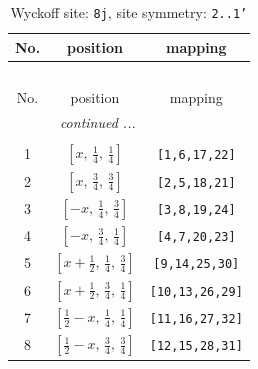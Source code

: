 \documentclass[fleqn,8pt]{jsarticle}
\begin{document}
\begin{longtable}{ccc}
\caption{Wyckoff site: {\tt 8j}, site symmetry: {\tt 2..1'}}
 \\
 \hline \hline
No. & position & mapping \\ \hline \endfirsthead

\multicolumn{2}{l}{\tablename\ \thetable{}} \\
 \hline \hline
No. & position & mapping \\ \hline \endhead

 \hline \hline
\multicolumn{2}{r}{\footnotesize\it continued ...} \\ \endfoot

 \hline \hline
\multicolumn{2}{r}{} \\ \endlastfoot

1 & $\left[ x,\, \frac{1}{4},\, \frac{1}{4} \right]$ & {\tt [1,6,17,22]} \\ \hline
2 & $\left[ x,\, \frac{3}{4},\, \frac{3}{4} \right]$ & {\tt [2,5,18,21]} \\ \hline
3 & $\left[ - x,\, \frac{1}{4},\, \frac{3}{4} \right]$ & {\tt [3,8,19,24]} \\ \hline
4 & $\left[ - x,\, \frac{3}{4},\, \frac{1}{4} \right]$ & {\tt [4,7,20,23]} \\ \hline
5 & $\left[ x + \frac{1}{2},\, \frac{1}{4},\, \frac{3}{4} \right]$ & {\tt [9,14,25,30]} \\ \hline
6 & $\left[ x + \frac{1}{2},\, \frac{3}{4},\, \frac{1}{4} \right]$ & {\tt [10,13,26,29]} \\ \hline
7 & $\left[ \frac{1}{2} - x,\, \frac{1}{4},\, \frac{1}{4} \right]$ & {\tt [11,16,27,32]} \\ \hline
8 & $\left[ \frac{1}{2} - x,\, \frac{3}{4},\, \frac{3}{4} \right]$ & {\tt [12,15,28,31]} \\
\end{longtable}
\renewcommand{\arraystretch}{1.2}
\end{document}
